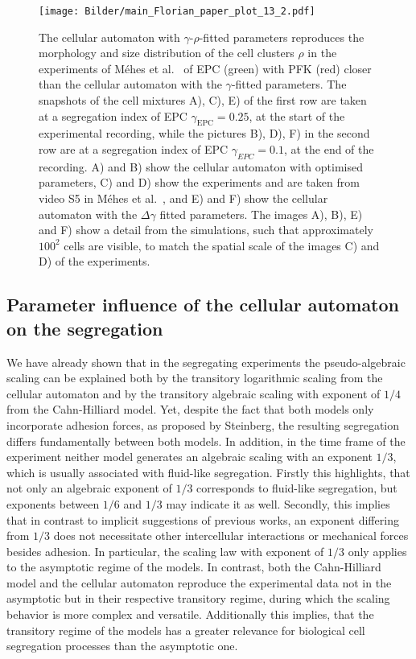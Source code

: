 \documentclass[10pt,letterpaper]{article}
\begin{document}
\begin{figure}[ht!]
 \centering
 \texttt{[image: Bilder/main\_Florian\_paper\_plot\_13\_2.pdf]}
 \caption{The cellular automaton with $\gamma$-$\rho$-fitted parameters
    reproduces the morphology and size distribution of
    the cell clusters $\rho$ in the experiments of Méhes et
    al.~\cite{MehMonNemVic2012} of EPC (green) with PFK (red) closer than the
    cellular automaton with the $\gamma$-fitted parameters. The snapshots of the
    cell mixtures A), C), E) of the first row are taken at a segregation
    index of EPC $\gamma_\text{EPC}=0.25$, at the start of the experimental
    recording, while the pictures B), D), F) in the second row are at a
    segregation index of EPC $\gamma_{EPC}=0.1$, at the end of the recording.
    A) and B) show the cellular automaton with optimised parameters, C) and D)
    show the experiments and are taken from video S5 in Méhes et
    al.~\cite{MehMonNemVic2012}, and E) and F) show the cellular automaton with
    the $\Delta\gamma$ fitted parameters. The images A), B), E) and F) show a
    detail from the simulations, such that approximately $100^2$ cells are
    visible, to match the spatial scale of the images C) and D) of the
    experiments.}
 \label{fig:main_Florian_paper_plot_13_2}
\end{figure}

\subsection*{Parameter influence of the cellular automaton on the segregation}

We have already shown that in the segregating experiments the pseudo-algebraic
scaling can be explained both by the transitory logarithmic scaling
from the cellular automaton and by the transitory algebraic scaling with
exponent of $1/4$ from the Cahn-Hilliard model. Yet, despite the fact
that both models only incorporate adhesion forces, as proposed by
Steinberg, the resulting segregation differs fundamentally between
both models. In addition, in the time frame of the experiment neither
model generates an algebraic scaling with an exponent $1/3$, which is
usually associated with fluid-like segregation. Firstly this
highlights, that not only an algebraic exponent of $1/3$ corresponds
to fluid-like segregation, but exponents between $1/6$ and $1/3$ may
indicate it as well. Secondly, this implies that in contrast to
implicit suggestions of previous works, an exponent differing from
$1/3$ does not necessitate other intercellular interactions or
mechanical forces besides adhesion. In particular, the scaling law
with exponent of $1/3$ only applies to the asymptotic regime of the
models. In contrast, both the Cahn-Hilliard model and the cellular
automaton reproduce the experimental data not in the asymptotic but in
their respective transitory regime, during which the scaling behavior
is more complex and versatile. Additionally this implies, that the
transitory regime of the models has a greater relevance for biological
cell segregation processes than the asymptotic one.
\end{document}
